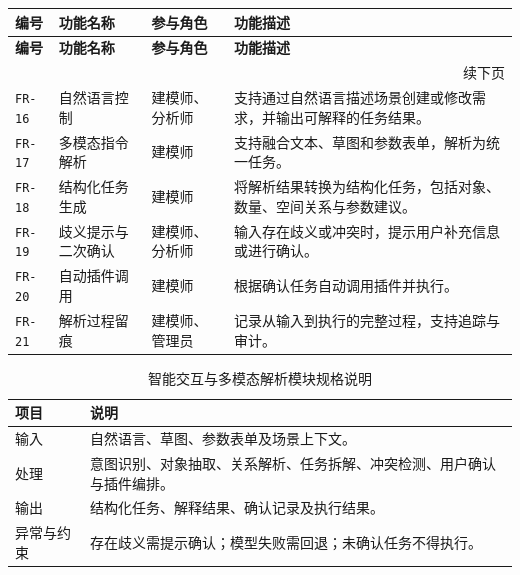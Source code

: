 \documentclass[UTF8,a4paper,10pt]{ctexart}
\begin{document}
{
\renewcommand{\arraystretch}{1.35}

\begin{longtable}{p{1.8cm} p{2.6cm} p{2.2cm} p{6.2cm}}
\toprule
\rowcolor{gray!20}
\textbf{编号} & \textbf{功能名称} & \textbf{参与角色} & \textbf{功能描述} \\
\midrule
\endfirsthead

\toprule
\rowcolor{gray!20}
\textbf{编号} & \textbf{功能名称} & \textbf{参与角色} & \textbf{功能描述} \\
\midrule
\endhead

\midrule
\multicolumn{4}{r}{\small 续下页}\\
\endfoot

\bottomrule
\endlastfoot

\texttt{FR-16} & 自然语言控制 & 建模师、分析师 & 支持通过自然语言描述场景创建或修改需求，并输出可解释的任务结果。 \\
\texttt{FR-17} & 多模态指令解析 & 建模师 & 支持融合文本、草图和参数表单，解析为统一任务。 \\
\texttt{FR-18} & 结构化任务生成 & 建模师 & 将解析结果转换为结构化任务，包括对象、数量、空间关系与参数建议。 \\
\texttt{FR-19} & 歧义提示与二次确认 & 建模师、分析师 & 输入存在歧义或冲突时，提示用户补充信息或进行确认。 \\
\texttt{FR-20} & 自动插件调用 & 建模师 & 根据确认任务自动调用插件并执行。 \\
\texttt{FR-21} & 解析过程留痕 & 建模师、管理员 & 记录从输入到执行的完整过程，支持追踪与审计。 \\

\end{longtable}
}

{
\renewcommand{\arraystretch}{1.3}

\begin{table}[H]
\centering
\caption{智能交互与多模态解析模块规格说明}

\begin{tabularx}{\textwidth}{p{2.6cm} Y}
\toprule
{}
\textbf{项目} & \textbf{说明} \\
\midrule

输入 & 自然语言、草图、参数表单及场景上下文。 \\
处理 & 意图识别、对象抽取、关系解析、任务拆解、冲突检测、用户确认与插件编排。 \\
输出 & 结构化任务、解释结果、确认记录及执行结果。 \\
异常与约束 & 存在歧义需提示确认；模型失败需回退；未确认任务不得执行。 \\

\bottomrule
\end{tabularx}
\end{table}
}
\end{document}
